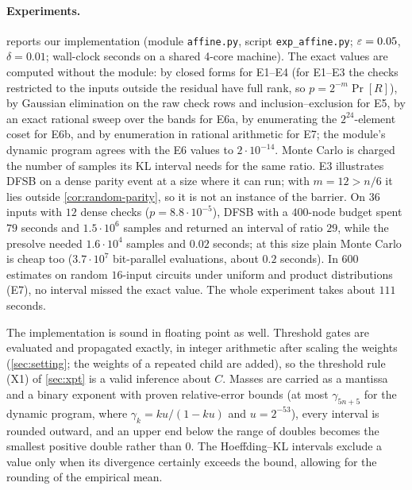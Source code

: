 \paragraph{Experiments.}
 reports our implementation (module \texttt{affine.py}, script
\texttt{exp\_affine.py}; $\varepsilon=0.05$, $\delta=0.01$; wall-clock seconds on a shared
4-core machine). The exact values are
computed without the module: by closed forms for E1--E4 (for E1--E3 the checks
restricted to the inputs outside the residual have full rank, so $p=2^{-m}\Pr[R]$), by
Gaussian elimination on the raw check rows and inclusion--exclusion for E5, by an exact
rational sweep over the bands for E6a, by enumerating the $2^{24}$-element coset for
E6b, and by enumeration in rational arithmetic for E7; the module's dynamic program
agrees with the E6 values to $2\cdot10^{-14}$. Monte Carlo is charged the number of samples its KL interval needs
for the same ratio. E3 illustrates DFSB on a dense parity event at a size where it can
run; with $m=12>n/6$ it lies outside \cref{cor:random-parity}, so it is not an instance
of the barrier. On $36$ inputs with $12$ dense checks ($p=8.8\cdot10^{-5}$), DFSB with a
$400$-node budget spent $79$ seconds and $1.5\cdot10^6$ samples and returned an interval
of ratio $29$, while the presolve needed $1.6\cdot10^4$ samples and $0.02$ seconds; at
this size plain Monte Carlo is cheap too ($3.7\cdot10^7$ bit-parallel evaluations, about
$0.2$ seconds). In $600$ estimates on random $16$-input circuits under uniform and
product distributions (E7), no interval missed the exact value. The whole experiment
takes about $111$ seconds.

The implementation is sound in floating point as well. Threshold gates are evaluated and
propagated exactly, in integer arithmetic after scaling the weights (\cref{sec:setting};
the weights of a repeated child are added), so the threshold rule (X1) of
\cref{sec:xpt} is a valid inference about $C$. Masses are carried as a
mantissa and a binary exponent with proven relative-error bounds (at most
$\gamma_{5n+5}$ for the dynamic program, where $\gamma_k=ku/(1-ku)$ and $u=2^{-53}$),
every interval is rounded outward, and an upper end below the range of doubles becomes
the smallest positive double rather than $0$. The Hoeffding--KL intervals exclude a value
only when its divergence certainly exceeds the bound, allowing for the rounding of the
empirical mean.

